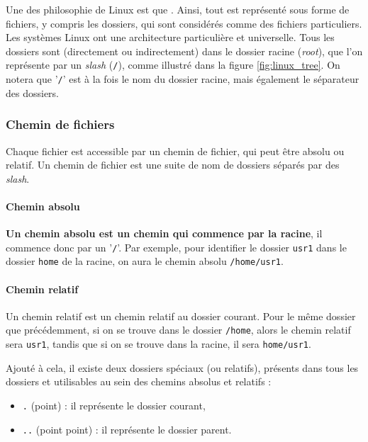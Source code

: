 Une des philosophie de Linux est que \textbf{}. Ainsi, tout est représenté sous forme de fichiers, y compris les dossiers, qui sont considérés comme des fichiers particuliers. Les systèmes Linux ont une architecture particulière et universelle. Tous les dossiers sont (directement ou indirectement) dans le dossier racine (\textit{root}), que l'on représente par un \textit{slash} (\texttt{/}), comme illustré dans la figure \ref{fig:linux_tree}. On notera que '\texttt{/}' est à la fois le nom du dossier racine, mais également le séparateur des dossiers.

\subsubsection{Chemin de fichiers}

Chaque fichier est accessible par un chemin de fichier, qui peut être absolu ou relatif. Un chemin de fichier est une suite de nom de dossiers séparés par des \textit{slash}.

\paragraph{Chemin absolu}

\textbf{Un chemin absolu est un chemin qui commence par la racine}, il commence donc par un '\texttt{/}'. Par exemple, pour identifier le dossier \texttt{usr1} dans le dossier \texttt{home} de la racine, on aura le chemin absolu \texttt{/home/usr1}.

\paragraph{Chemin relatif}

Un chemin relatif est un chemin relatif au dossier courant. Pour le même dossier que précédemment, si on se trouve dans le dossier \texttt{/home}, alors le chemin relatif sera \texttt{usr1}, tandis que si on se trouve dans la racine, il sera \texttt{home/usr1}.

Ajouté à cela, il existe deux dossiers spéciaux (ou relatifs), présents dans tous les dossiers et utilisables au sein des chemins absolus et relatifs : 
\begin{itemize}
    \item \texttt{.} (point) : il représente le dossier courant,
    \item \texttt{..} (point point) : il représente le dossier parent.
\end{itemize}


